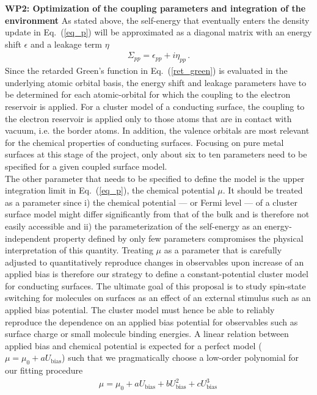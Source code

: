 \documentclass[a4paper,11pt,headings=normal]{scrartcl}
\begin{document}
\begin{itemize}
\noindent
\textbf{WP2: Optimization of the coupling parameters and integration of the environment} 
As stated above, the self-energy that eventually enters the density update in Eq.~(\ref{eq_p}) will be approximated as a diagonal matrix with an energy shift $\epsilon$ and a leakage term $\eta$
\begin{align}
\Sigma_{pp} = \epsilon_{pp} + i \eta_{pp} \, .
\label{self_en}
\end{align}
Since the retarded Green's function in Eq.~(\ref{ret_green}) is evaluated in the underlying atomic orbital basis, the energy shift and leakage parameters have to be determined for each atomic-orbital for which the coupling to the electron reservoir is applied.
For a cluster model of a conducting surface, the coupling to the electron reservoir is applied only to those atoms that are in contact with vacuum, i.e. the border atoms. In addition, the valence orbitals are most relevant for the chemical properties of conducting surfaces. Focusing on pure metal surfaces at this stage of the project, only about six to ten parameters need to be specified for a given coupled surface model. \\
The other parameter that needs to be specified to define the model is the upper integration limit in Eq.~(\ref{eq_p}), the chemical potential $\mu$. It should be treated as a parameter since i) the chemical potential --- or Fermi level --- of a cluster surface model might differ significantly from that of the bulk and is therefore not easily accessible and ii) the parameterization of the self-energy as an energy-independent property defined by only few parameters compromises the physical interpretation of this quantity. Treating $\mu$ as a parameter that is carefully adjusted to quantitatively reproduce changes in observables upon increase of an applied bias is therefore our strategy to define a constant-potential cluster model for conducting surfaces. The ultimate goal of this proposal is to study spin-state switching for molecules on surfaces as an effect of an external stimulus such as an applied bias potential. The cluster model must hence be able to reliably reproduce the dependence on an applied bias potential for observables such as surface charge or small molecule binding energies. A linear relation between applied bias and chemical potential is expected for a perfect model ($\mu=\mu_0+a U_\text{bias}$) such that we pragmatically choose a low-order polynomial for our fitting procedure
\begin{align}
\mu=\mu_0+a U_\text{bias}+ b U_\text{bias}^2+ c U_\text{bias}^3 \, 

\end{align}
\end{itemize}
\end{document}

